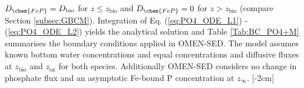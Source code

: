 \documentclass[gmd, manuscript]{copernicus}
\begin{document}
$D_{\chem{FeP}}=D_{\mathrm{bio}}$ for $z\leq z_{\mathrm{bio}}$ and $D_{\chem{FeP}}=0$ for $z > z_{\mathrm{bio}}$ (compare Section \ref{subsec:GBCM}). 
Integration of Eq. (\ref{eq:PO4_ODE_L1}) - (\ref{eq:PO4_ODE_L2}) yields the analytical solution and Table \ref{Tab:BC_PO4+M} summarises the boundary conditions applied in OMEN-SED.
The model assumes known bottom water concentrations and equal concentrations and diffusive fluxes at $z_{\mathrm{bio}}$ and $z_{\mathrm{ox}}$ for both species. 
Additionally OMEN-SED considers no change in phosphate flux and an asymptotic Fe-bound P concentration at $z_\infty$.
[-2cm]%
\end{document}
